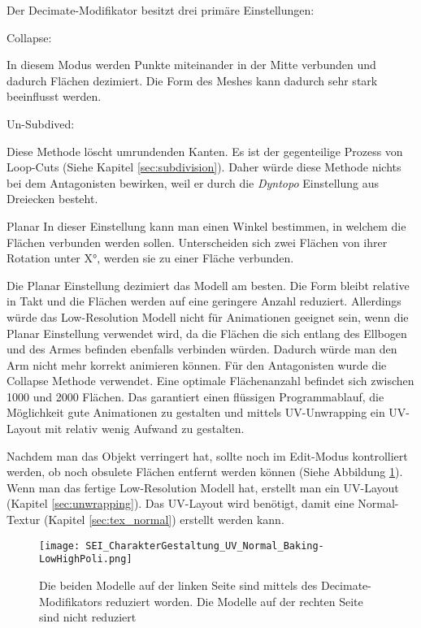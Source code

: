 Der Decimate-Modifikator besitzt drei primäre Einstellungen:

Collapse:

In diesem Modus werden Punkte miteinander in der Mitte verbunden und dadurch Flächen dezimiert. Die Form des Meshes
kann dadurch sehr stark beeinflusst werden.

Un-Subdived:

Diese Methode löscht umrundenden Kanten. Es ist der gegenteilige Prozess von Loop-Cuts (Siehe Kapitel \ref{sec:subdivision}).
Daher würde diese Methode nichts bei dem Antagonisten bewirken, weil er durch die \textit{Dyntopo} Einstellung aus
Dreiecken besteht.

Planar
In dieser Einstellung kann man einen Winkel bestimmen, in welchem die Flächen verbunden werden sollen.
Unterscheiden sich zwei Flächen von ihrer Rotation unter X°, werden sie zu einer Fläche verbunden.


Die Planar Einstellung dezimiert das Modell am besten. Die Form bleibt relative in Takt und die Flächen werden auf eine
geringere Anzahl reduziert. Allerdings würde das Low-Resolution Modell nicht für Animationen geeignet sein, wenn die
Planar Einstellung verwendet wird, da die Flächen die sich entlang des Ellbogen und des Armes befinden ebenfalls
verbinden würden. Dadurch würde man den Arm nicht mehr korrekt animieren können. Für den Antagonisten wurde die
Collapse Methode verwendet. Eine optimale Flächenanzahl befindet sich zwischen 1000 und 2000 Flächen. Das garantiert
einen flüssigen Programmablauf, die Möglichkeit gute Animationen zu gestalten und mittels UV-Unwrapping ein UV-Layout
mit relativ wenig Aufwand zu gestalten.

Nachdem man das Objekt verringert hat, sollte noch im Edit-Modus kontrolliert werden, ob noch obsulete Flächen entfernt
werden können (Siehe Abbildung \ref{picture:antagonist_decimated}). Wenn man das fertige Low-Resolution Modell hat,
erstellt man ein UV-Layout (Kapitel \ref{sec:unwrapping}).
Das UV-Layout wird benötigt, damit eine Normal-Textur (Kapitel \ref{sec:tex_normal}) erstellt werden kann.

\begin{figure}[h]
    \centering
    \texttt{[image: SEI\_CharakterGestaltung\_UV\_Normal\_Baking-LowHighPoli.png]}
    \caption{Die beiden Modelle auf der linken Seite sind mittels des Decimate-Modifikators reduziert worden. Die Modelle auf der rechten Seite sind nicht reduziert}
    \label{picture:antagonist_decimated}
\end{figure}




